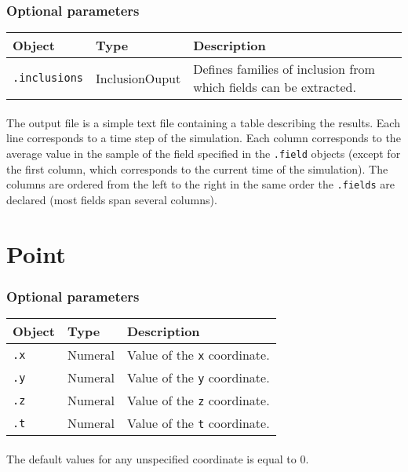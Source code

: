 \documentclass[10pt]{article}
\begin{document}
\subsubsection*{Optional parameters}

\begin{tabularx}{\textwidth}{llX}
\hline 
Object & Type & Description \\ 
\hline 
\verb+.inclusions+ & InclusionOuput & Defines families of inclusion from which fields can be extracted. \\ 
\hline 
\end{tabularx}

\paragraph{} The output file is a simple text file containing a table describing the results. Each line corresponds to a time step of the simulation. Each column corresponds to the average value in the sample of the field specified in the \verb+.field+ objects (except for the first column, which corresponds to the current time of the simulation). The columns are ordered from the left to the right in the same order the \verb+.fields+ are declared (most fields span several columns).

\section{Point}

\subsubsection*{Optional parameters}

\begin{tabularx}{\textwidth}{llX}
\hline 
Object & Type & Description \\ 
\hline 
\verb+.x+ & Numeral & Value of the \verb+x+ coordinate.\\ 
\verb+.y+ & Numeral & Value of the \verb+y+ coordinate.\\ 
\verb+.z+ & Numeral & Value of the \verb+z+ coordinate.\\ 
\verb+.t+ & Numeral & Value of the \verb+t+ coordinate.\\ 
\hline 
\end{tabularx}

\paragraph{} The default values for any unspecified coordinate is equal to 0.
\end{document}
